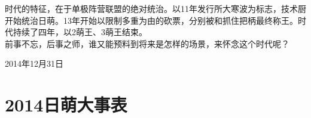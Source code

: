 时代的特征，在于单极阵营联盟的绝对统治。以11年发行所大寒波为标志，技术厨开始统治日萌。13年开始以限制多重为由的砍票，分别被和抓住把柄最终称王。时代持续了四年，以2萌王、3萌王结束。
\\

前事不忘，后事之师，谁又能预料到将来是怎样的场景，来怀念这个时代呢？

\begin{flushright}
  \rm{}

  \kai 2014年12月31日
\end{flushright}

\chapter*{2014日萌大事表}

